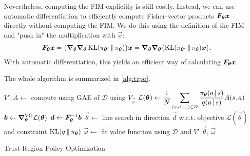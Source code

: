 			Nevertheless, computing the \ac{FIM} explicitly is still costly. Instead, we can use automatic differentiation to efficiently compute Fisher-vector products \( \bm{F}_{\bm{\theta}} \bm{x} \) directly without computing the \ac{FIM}. We do this using the definition of the \ac{FIM} and "push in" the multiplication with \(\vec{x}\):
			\begin{equation}
				\bm{F}_{\bm{\theta}} \bm{x}
					= \bigl( \grad_{\bm{\theta}} \grad_{\bm{\theta}} \operatorname{KL}(\pi_{\bm{\theta}'} \,\Vert\, \pi_{\bm{\theta}}) \bigr) \bm{x}
					= \grad_{\bm{\theta}} \grad_{\bm{\theta}} \bigl( \operatorname{KL}(\pi_{\bm{\theta}'} \,\Vert\, \pi_{\bm{\theta}}) \bm{x} \bigr).
			\end{equation}
			With automatic differentiation, this yields an efficient way of calculating \( \bm{F}_{\bm{\theta}} \bm{x} \).

			The whole algorithm is summarized in \autoref{alg:trpo}.

			\begin{algorithm}  \DontPrintSemicolon
				\(\displaystyle V', A \gets \) compute using \acs{GAE} of \(\mathcal{D}\) using \(V_{\vec{\omega}}\) \;
				\(\displaystyle \mathcal{L}(\bm{\theta}) \gets \frac{1}{N} \sum_{(s, a, \cdot, \cdot) \in \mathcal{D}} \frac{\pi_{\bm{\theta}}(a \,\vert\, s)}{q(a \,\vert\, s)} A(s, a) \)  \quad\quad{}
				\(\displaystyle \bm{b} \gets \grad_{\bm{\theta}}^\mathrm{VG} \mathcal{L}(\bm{\theta}) \)  \quad{}
				\(\displaystyle \bm{d} \gets \bm{F}_{\bm{\theta}}^{-1} \bm{b} \)  \quad{}
				\(\displaystyle \vec{\theta} \gets \) line search in direction \(\vec{d}\) w.r.t. objective \( \mathcal{L}(\vec{\theta}) \) and constraint \( \operatorname{KL}(q \,\Vert\, \pi_{\bm{\theta}}) \) \;
				\(\displaystyle \vec{\omega} \gets \) fit value function using \(\mathcal{D}\) and \(V'\) \;
				\Return \(\vec{\theta}\), \(\vec{\omega}\)
				\caption{Trust-Region Policy Optimization}
				\label{alg:trpo}
			\end{algorithm}


